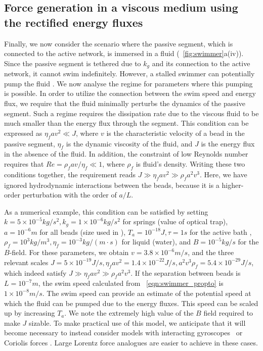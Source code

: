 \documentclass[
 preprint,
 preprintnumbers,
 amsmath,amssymb,
 aps,
 pre,
 longbibliography,
 superscriptaddress,
 10pt, twocolumn
]{revtex4-1}
\begin{document}
\subsection{Force generation in a viscous medium using the rectified energy fluxes}
\label{sec:pumping}
Finally, we now consider the scenario where the passive segment, which is connected to the active network, is immersed in a fluid (\figurename~\ref{fig:swimmer}a(iv)). Since the passive segment is tethered due to $k_g$ and its connection to the active network, it cannot swim indefinitely. However, a stalled swimmer can potentially pump the fluid \cite{Leoni2009BasicSwimmer}. We now analyse the regime for parameters where this pumping is possible.
In order to utilize the connection between the swim speed and energy flux, we require that the fluid minimally perturbs the dynamics of the passive segment. Such a regime requires the dissipation rate due to the viscous fluid to be much smaller than the energy flux through the segment. This condition can be expressed as $\eta_f a v^2 \ll J$, where $v$ is the characteristic velocity of a bead in the passive segment, $\eta_f$ is the dynamic viscosity of the fluid, and $J$ is the energy flux in the absence of the fluid.
In addition, the constraint of low Reynolds number requires that $Re = \rho_f a v /\eta_f \ll 1$, where $\rho_f$ is fluid's density.
Writing these two conditions together, the requirement reads $J \gg \eta_f a v^2 \gg \rho_f a^2 v^3$. 
Here, we have ignored hydrodynamic interactions between the beads, because it is a higher-order perturbation with the order of $a/L$. 

As a numerical example, this condition can be satisfied by setting $k=5\times 10^{-5} kg/s^2, k_g=1\times 10^{-6} kg/s^2$ for springs (value of optical trap), $a=10^{-6}m$ for all beads (size used in \cite{Leoni2009BasicSwimmer}), $T_a=10^{-18} J, \tau=1s$ for the active bath \cite{Wu2000ParticleDiffusion}, $\rho_f=10^3kg/m^3, \eta_f=10^{-3}kg/(m\cdot s)$ for liquid (water), and $B=10^{-5} kg/s$ for the $B$-field.
For these parameters, we obtain $v=3.8\times 10^{-6}m/s$, and the three relevant scales $J=5\times 10^{-19}J/s, \eta_f av^2=1.4\times 10^{-22}J/s, a^2v^3\rho_f=5.4\times 10^{-29}J/s$, which indeed satisfy $J \gg \eta_f a v^2 \gg \rho_f a^2 v^3$.
If the separation between beads is $L=10^{-7}m$, the swim speed calculated from \eqnname~\eqref{eqn:swimmer_propto} is $1\times 10^{-8} m/s$. 
The swim speed can provide an estimate of the potential speed at which the fluid can be pumped due to the energy fluxes. 
This speed can be scaled up by increasing $T_a$.
We note the extremely high value of the $B$ field required to make $J$ sizable. To make practical use of this model, we anticipate that it will become necessary to instead consider models with interacting gyroscopes~\cite{Nash2015TopologicalMechanics} or Coriolis forces \cite{Kahlert2012MagnetizingComplex}. Large Lorentz force analogues are easier to achieve in these cases. 
\end{document}
